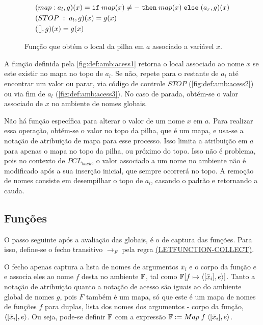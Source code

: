 \begin{figure}[ht]
	\begin{align}
		&(map : a_l, g)(x) = \texttt{if}\; map(x) \neq - \;\texttt{then}\; map(x) \;\texttt{else}\; (a_r, g)(x)\label{fig:def:amb:acess1}\\
		&(STOP \;:\;a_l, g)(x) = g(x) \label{fig:def:amb:acess2}\\
		&([], g)(x) = g(x)\label{fig:def:amb:acess3}
	\end{align}
	\caption{Função que obtém o local da pilha em $a$ associado a variável $x$. }
	\label{fig:def:amb:acess}
\end{figure}

A função definida pela \autoref{fig:def:amb:acess1} retorna o local associado ao nome $x$ se este existir no mapa no topo de $a_l$. Se não, repete para o restante de $a_l$ até encontrar um valor ou parar, via código de controle $STOP$ (\autoref{fig:def:amb:acess2}) ou via fim de $a_l$ (\autoref{fig:def:amb:acess3}). No caso de parada, obtém-se o valor associado de $x$ no ambiente de nomes globais.

Não há função específica para alterar o valor de um nome $x$ em $a$. Para realizar essa operação, obtém-se o valor no topo da pilha, que é um mapa, e usa-se a notação de atribuição de mapa para esse processo. Isso limita a atribuição em $a$ para apenas o mapa no topo da pilha, ou próximo do topo. Isso não é problema, pois no contexto de $PCL_{back}$, o valor associado a um nome no ambiente não é modificado após a sua inserção inicial, que sempre ocorrerá no topo. A remoção de nomes consiste em desempilhar o topo de $a_l$, casando o padrão e retornando a cauda.

\subsection{Funções}

O passo seguinte após a avaliação das globais, é o de captura das funções. Para isso, define-se o fecho transitivo $\to_F$ pela regra \hyperref[rule:func-collect]{(LETFUNCTION-COLLECT)}. 

\noindent O fecho apenas captura a lista de nomes de argumentos $\bar x_i$ e o corpo da função $e$ e associa eles ao nome $f$ desta no ambiente $\mathbb{F}$, tal como $\mathbb{F}[f \mapsto \langle [\bar x_i], e \rangle]$. Tanto a notação de atribuição quanto a notação de acesso são iguais ao do ambiente global de nomes $g$, pois $F$ também é um mapa, só que este é um mapa de nomes de funções $f$ para duplas, lista dos nomes dos argumentos - corpo da função, $\langle [\bar x_i], e \rangle$. Ou seja, pode-se definir $\mathbb{F}$ com a expressão $\mathbb{F} := Map\;f\; \langle [\bar x_i], e \rangle$.


